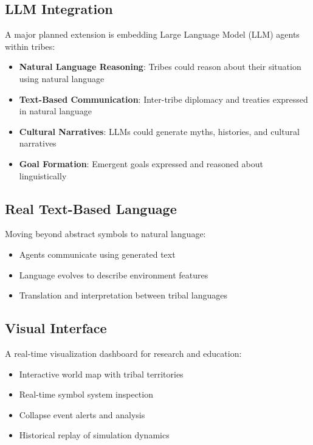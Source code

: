 \documentclass[11pt,a4paper]{article}
\begin{document}
\subsection{LLM Integration}

A major planned extension is embedding Large Language Model (LLM) agents within tribes:

\begin{itemize}
    \item \textbf{Natural Language Reasoning}: Tribes could reason about their situation using natural language
    \item \textbf{Text-Based Communication}: Inter-tribe diplomacy and treaties expressed in natural language
    \item \textbf{Cultural Narratives}: LLMs could generate myths, histories, and cultural narratives
    \item \textbf{Goal Formation}: Emergent goals expressed and reasoned about linguistically
\end{itemize}

\subsection{Real Text-Based Language}

Moving beyond abstract symbols to natural language:

\begin{itemize}
    \item Agents communicate using generated text
    \item Language evolves to describe environment features
    \item Translation and interpretation between tribal languages
\end{itemize}

\subsection{Visual Interface}

A real-time visualization dashboard for research and education:

\begin{itemize}
    \item Interactive world map with tribal territories
    \item Real-time symbol system inspection
    \item Collapse event alerts and analysis
    \item Historical replay of simulation dynamics
\end{itemize}
\end{document}
